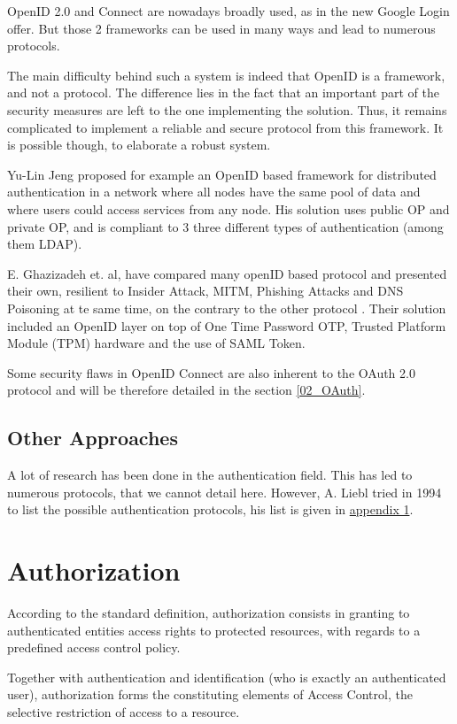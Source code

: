 OpenID 2.0 and Connect are nowadays broadly used, as in the new Google Login offer. But those 2 frameworks can be used in many ways and lead to numerous protocols.

The main difficulty behind such a system is indeed that OpenID is a framework, and not a protocol. The difference lies in the fact that an important part of the security measures are left to the one implementing the solution. Thus, it remains complicated to implement a reliable and secure protocol from this framework. It is possible though, to elaborate a robust system. 

Yu-Lin Jeng proposed for example an OpenID based framework for distributed authentication in a network where all nodes have the same pool of data and where users could access services from any node. His solution uses public OP and private OP, and is compliant to 3 three different types of authentication (among them LDAP)\cite{Jeng2012}.

E. Ghazizadeh et. al, have compared many openID based protocol and presented their own, resilient to Insider Attack, MITM, Phishing Attacks and DNS Poisoning at te same time, on the contrary to the other protocol \cite{Ghazizadeh}. Their solution included an OpenID layer on top of One Time Password OTP, Trusted Platform Module (TPM) hardware and the use of  SAML Token.

Some security flaws in OpenID Connect are also inherent to the OAuth 2.0 protocol and will be therefore detailed in the section \ref{02_OAuth}. 

\subsection{Other Approaches}
A lot of research has been done in the authentication field. This has led to numerous protocols, that we cannot detail here. However,  A. Liebl tried in 1994 to list the possible authentication protocols, his list is given in \hyperref[appendix:protocol_list]{appendix 1}. 

\section{Authorization}
\label{02_authorization}
According to the standard definition, authorization consists in granting to authenticated entities access rights to protected resources, with regards to a predefined access control policy.

Together with authentication and identification (who is exactly an authenticated user), authorization forms the constituting elements of Access Control, the selective restriction of access to a resource.

